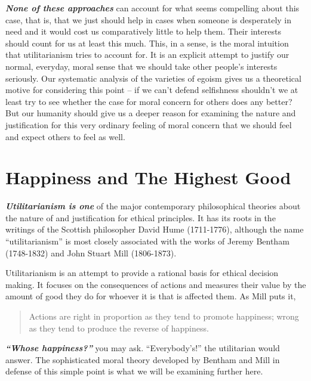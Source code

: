 \documentclass[
  12pt, openany]{book}
\begin{document}
\textbf{\emph{None of these approaches}} can account for what seems compelling about this case, that is, that we just should help in cases when someone is desperately in need and it would cost us comparatively little to help them. Their interests should count for us at least this much. This, in a sense, is the moral intuition that utilitarianism tries to account for. It is an explicit attempt to justify our normal, everyday, moral sense that we should take other people's interests seriously. Our systematic analysis of the varieties of egoism gives us a theoretical motive for considering this point -- if we can't defend selfishness shouldn't we at least try to see whether the case for moral concern for others does any better? But our humanity should give us a deeper reason for examining the nature and justification for this very ordinary feeling of moral concern that we should feel and expect others to feel as well.

\hypertarget{happiness-and-the-highest-good}{%
\section{Happiness and The Highest Good}\label{happiness-and-the-highest-good}}

\textbf{\emph{Utilitarianism is one}} of the major contemporary philosophical theories about the nature of and justification for ethical principles. It has its roots in the writings of the Scottish philosopher David Hume (1711-1776), although the name ``utilitarianism'' is most closely associated with the works of Jeremy Bentham (1748-1832) and John Stuart Mill (1806-1873).

Utilitarianism is an attempt to provide a rational basis for ethical decision making. It focuses on the consequences of actions and measures their value by the amount of good they do for whoever it is that is affected them. As Mill puts it,

\begin{quote}
Actions are right in proportion as they tend to promote happiness; wrong as they tend to produce the reverse of happiness.
\end{quote}

\textbf{\emph{``Whose happiness?''}} you may ask. ``Everybody's!'' the utilitarian would answer. The sophisticated moral theory developed by Bentham and Mill in defense of this simple point is what we will be examining further here.
\end{document}
